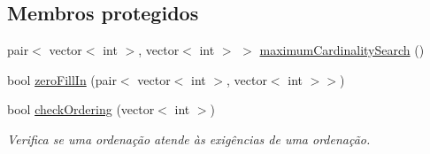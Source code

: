 \subsection*{Membros protegidos}
\begin{DoxyCompactItemize}
\item 
pair$<$ vector$<$ int $>$, vector$<$ int $>$ $>$ \mbox{\hyperlink{classGraphGen_a7811947062c0aa0fd1c56af0442dc9ad}{maximum\+Cardinality\+Search}} ()
\item 
bool \mbox{\hyperlink{classGraphGen_ad22d4dd7a1006663e1ba653c16b26e1a}{zero\+Fill\+In}} (pair$<$ vector$<$ int $>$, vector$<$ int $>$$>$)
\item 
\mbox{\label{classGraphGen_ac4ae31e7a52c9b2227ab8deb47d091a5}} 
bool \mbox{\hyperlink{classGraphGen_ac4ae31e7a52c9b2227ab8deb47d091a5}{check\+Ordering}} (vector$<$ int $>$)
\begin{DoxyCompactList}\small\item\em Verifica se uma ordenação atende às exigências de uma ordenação. \end{DoxyCompactList}\end{DoxyCompactItemize}

